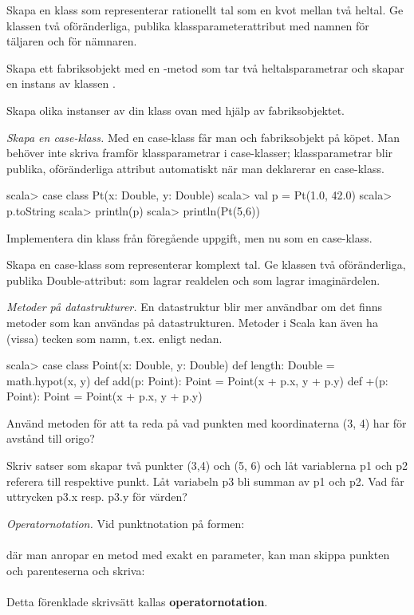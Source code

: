 \Subtask Skapa en klass  som representerar rationellt tal som en kvot mellan två heltal. Ge klassen två oföränderliga, publika klassparameterattribut med namnen  för täljaren och  för nämnaren. 

\Subtask Skapa ett fabriksobjekt med en -metod som tar två heltalsparametrar och skapar en instans av klassen .

\Subtask Skapa olika instanser av din klass  ovan med hjälp av fabriksobjektet.


\Task \emph{Skapa en case-klass.} Med en case-klass får man  och fabriksobjekt på köpet. Man behöver inte skriva  framför klassparametrar i case-klasser; klassparametrar blir publika, oföränderliga attribut automatiskt när man deklarerar en case-klass.

\begin{REPL}
scala> case class Pt(x: Double, y: Double) 
scala> val p = Pt(1.0, 42.0)
scala> p.toString
scala> println(p)
scala> println(Pt(5,6))
\end{REPL}

\Subtask Implementera din klass  från föregående uppgift, men nu som en case-klass.

\Subtask Skapa en case-klass  som representerar komplext tal. Ge klassen två oföränderliga, publika Double-attribut:  som lagrar realdelen och  som lagrar imaginärdelen. 

\Task \label{task:point} \emph{Metoder på datastrukturer.} En datastruktur blir mer användbar om det finns metoder som kan användas på datastrukturen. Metoder i Scala kan även ha (vissa) tecken som namn, t.ex. \code{+} enligt nedan.  
\begin{REPL}
scala> case class Point(x: Double, y: Double) {
         def length: Double = math.hypot(x, y)   
         def add(p: Point): Point = Point(x + p.x, y + p.y)
         def +(p: Point): Point = Point(x + p.x, y + p.y)
       }
\end{REPL}

\Subtask Använd metoden  för att ta reda på vad punkten med koordinaterna (3, 4) har för avstånd till origo?

\Subtask Skriv satser som skapar två punkter (3,4) och (5, 6) och låt variablerna p1 och p2 referera till respektive punkt. Låt variabeln p3 bli summan av p1 och p2. Vad får uttrycken p3.x resp. p3.y för värden?

\Task \emph{Operatornotation.} Vid punktnotation på formen: \\  \\ där man anropar en metod med exakt en parameter, kan man skippa punkten och parenteserna och skriva:\\   \\
Detta förenklade skrivsätt kallas \textbf{operatornotation}.

